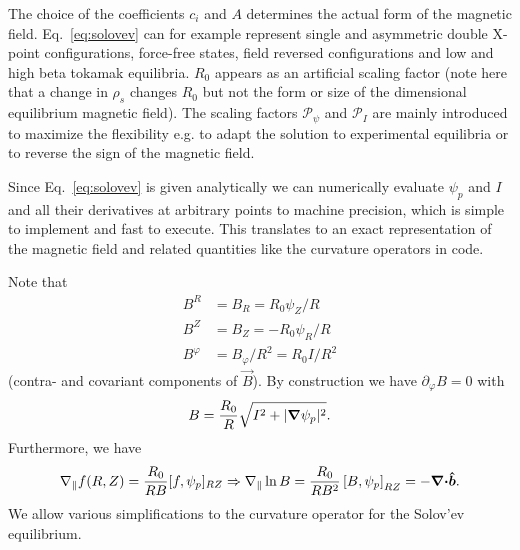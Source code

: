 The choice of the coefficients \(c_{i}\) and \(A\) determines the actual form
of the magnetic field.
Eq.~\eqref{eq:solovev} can for example represent single and asymmetric double X-point configurations, force-free states,
field reversed configurations and low and high beta tokamak equilibria.
$R_0$ appears as an artificial scaling factor
(note here that a change in $\rho_s$ changes $R_0$ but not the form or size of
the dimensional equilibrium magnetic field).
The scaling factors $\mathcal P_\psi$ and $\mathcal P_I$ are mainly introduced to maximize the flexibility e.g. to adapt the solution to experimental equilibria or to reverse the sign of the magnetic field.

Since Eq.~\eqref{eq:solovev} is given analytically we can numerically evaluate $\psi_p$ and $I$
and all their derivatives
at arbitrary points to machine precision, which is simple to implement and fast to execute.
This translates to an exact representation of the magnetic field and related quantities like the curvature operators in code.

Note that
\begin{align}
    B^R&=B_R = R_0\psi_Z/R \\
    B^Z&=B_Z = - R_0\psi_R/R \\
    B^\varphi &= B_\varphi/R^2 = R_0I/R^2
\end{align}
(contra- and covariant components of $\vec B$).
By construction we have $\partial_\varphi B = 0$ with
\begin{align}
  B = \frac{R_0}{R}\sqrt{ {I^2 + |{\boldsymbol{\nabla}} \psi_p|^2}}.
    \label{}
\end{align}
Furthermore, we have
\begin{align}
  \nabla_\parallel f(R,Z) = \frac{R_0}{RB}[f,\psi_p]_{RZ}\Rightarrow \nabla_\parallel \ln B = \frac{R_0}{RB^2}\left[B, \psi_p\right]_{RZ} = -{\boldsymbol{{\boldsymbol{\nabla}}\cdot}}\bm{\hat{b}}.
\end{align}
We allow various simplifications to the curvature operator
for the Solov'ev equilibrium.


